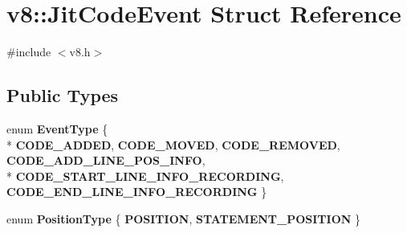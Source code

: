 \hypertarget{structv8_1_1_jit_code_event}{}\section{v8\+:\+:Jit\+Code\+Event Struct Reference}
\label{structv8_1_1_jit_code_event}


{\ttfamily \#include $<$v8.\+h$>$}

\subsection*{Public Types}
\begin{DoxyCompactItemize}
\item 
\hypertarget{structv8_1_1_jit_code_event_ac4f8e391762567a2710eb5552b5f11f7}{}enum {\bfseries Event\+Type} \{ \\*
{\bfseries C\+O\+D\+E\+\_\+\+A\+D\+D\+E\+D}, 
{\bfseries C\+O\+D\+E\+\_\+\+M\+O\+V\+E\+D}, 
{\bfseries C\+O\+D\+E\+\_\+\+R\+E\+M\+O\+V\+E\+D}, 
{\bfseries C\+O\+D\+E\+\_\+\+A\+D\+D\+\_\+\+L\+I\+N\+E\+\_\+\+P\+O\+S\+\_\+\+I\+N\+F\+O}, 
\\*
{\bfseries C\+O\+D\+E\+\_\+\+S\+T\+A\+R\+T\+\_\+\+L\+I\+N\+E\+\_\+\+I\+N\+F\+O\+\_\+\+R\+E\+C\+O\+R\+D\+I\+N\+G}, 
{\bfseries C\+O\+D\+E\+\_\+\+E\+N\+D\+\_\+\+L\+I\+N\+E\+\_\+\+I\+N\+F\+O\+\_\+\+R\+E\+C\+O\+R\+D\+I\+N\+G}
 \}\label{structv8_1_1_jit_code_event_ac4f8e391762567a2710eb5552b5f11f7}

\item 
\hypertarget{structv8_1_1_jit_code_event_a02ca6a3e363d0d95142591fd454c8ba9}{}enum {\bfseries Position\+Type} \{ {\bfseries P\+O\+S\+I\+T\+I\+O\+N}, 
{\bfseries S\+T\+A\+T\+E\+M\+E\+N\+T\+\_\+\+P\+O\+S\+I\+T\+I\+O\+N}
 \}\label{structv8_1_1_jit_code_event_a02ca6a3e363d0d95142591fd454c8ba9}

\end{DoxyCompactItemize}
